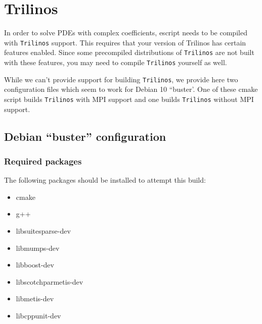 \chapter{Trilinos}
\label{app:trilinos}

In order to solve PDEs with complex coefficients, escript needs to be compiled with \texttt{Trilinos} support.
This requires that your version of Trilinos has certain features enabled.
Since some precompiled distributions of \texttt{Trilinos} are not built with these features, you may 
need to compile \texttt{Trilinos} yourself as well.

While we can't provide support for building \texttt{Trilinos}, we provide here two configuration files which seem to work for 
Debian 10 ``buster'. One of these cmake script builds \texttt{Trilinos} with MPI support and one builds \texttt{Trilinos} without MPI support.

\section{Debian ``buster'' configuration}


\subsection{Required packages}

The following packages should be installed to attempt this build:
\begin{itemize}
\item[] cmake
\item[] g++
\item[] libsuitesparse-dev
\item[] libmumps-dev
\item[] libboost-dev
\item[] libscotchparmetis-dev
\item[] libmetis-dev
\item[] libcppunit-dev
\end{itemize}






